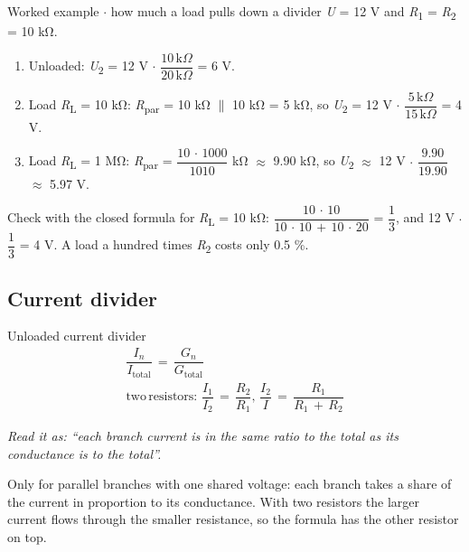 \documentclass[11pt]{article}
\begin{document}
\begin{keepsection}
\begin{keepsection}
\begin{workedbox}{Worked example \ensuremath{\cdot} how much a load pulls down a divider}
\textit{U} = 12 V and \textit{R}\textsubscript{1} = \textit{R}\textsubscript{2} = 10 kΩ.

\begin{enumerate}
\item Unloaded: \textit{U}\textsubscript{2} = 12 V \ensuremath{\cdot} {\small\ensuremath{\dfrac{10\, \mathrm{k}Ω}{20\, \mathrm{k}Ω}}} = 6 V.
\item Load \textit{R}\textsubscript{L} = 10 kΩ: \textit{R}\textsubscript{par} = 10 kΩ \ensuremath{\parallel} 10 kΩ = 5 kΩ, so \textit{U}\textsubscript{2} = 12 V \ensuremath{\cdot} {\small\ensuremath{\dfrac{5\, \mathrm{k}Ω}{15\, \mathrm{k}Ω}}} = 4 V.
\item Load \textit{R}\textsubscript{L} = 1 MΩ: \textit{R}\textsubscript{par} = {\small\ensuremath{\dfrac{10\, \cdot \, 1000}{1010}}} kΩ \ensuremath{\approx} 9.90 kΩ, so \textit{U}\textsubscript{2} \ensuremath{\approx} 12 V \ensuremath{\cdot} {\small\ensuremath{\dfrac{9.90}{19.90}}} \ensuremath{\approx} 5.97 V.
\end{enumerate}

Check with the closed formula for \textit{R}\textsubscript{L} = 10 kΩ: {\small\ensuremath{\dfrac{10\, \cdot \, 10}{10\, \cdot \, 10\, +\, 10\, \cdot \, 20}}} = {\small\ensuremath{\dfrac{1}{3}}}, and 12 V \ensuremath{\cdot} {\small\ensuremath{\dfrac{1}{3}}} = 4 V. A load a hundred times \textit{R}\textsubscript{2} costs only 0.5 \%.
\end{workedbox}
\end{keepsection}

\begin{keepsection}
\subsection{Current divider}

\begin{equationcard}{Unloaded current divider}
\[ \begin{gathered} \dfrac{{I}_{{n}}}{{I}_{\text{total}}}\, =\, \dfrac{{G}_{{n}}}{{G}_{\text{total}}} \\ \text{two}\, \text{resistors}:\, \dfrac{{I}_{1}}{{I}_{2}}\, =\, \dfrac{{R}_{2}}{{R}_{1}},\, \dfrac{{I}_{2}}{{I}}\, =\, \dfrac{{R}_{1}}{{R}_{1}\, +\, {R}_{2}} \end{gathered} \]
{\small \emph{Read it as: “each branch current is in the same ratio to the total as its conductance is to the total”.}\par Only for parallel branches with one shared voltage: each branch takes a share of the current in proportion to its conductance. With two resistors the larger current flows through the smaller resistance, so the formula has the other resistor on top.}
\end{equationcard}


\end{keepsection}
\end{keepsection}
\end{document}
